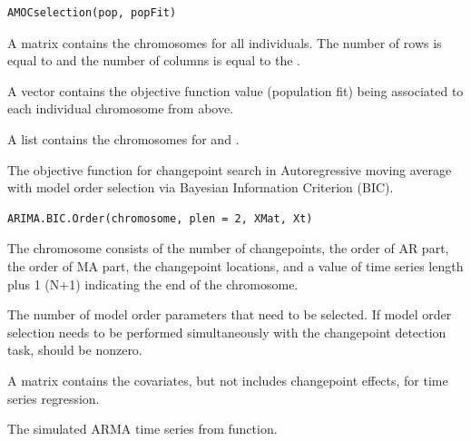 \documentclass[a4paper]{book}
\begin{document}
%
\begin{Usage}
\begin{verbatim}
AMOCselection(pop, popFit)
\end{verbatim}
\end{Usage}
%
\begin{Arguments}
\begin{ldescription}
\item[\code{pop}] A matrix contains the chromosomes for all individuals. The number of
rows is equal to  and the number of columns is equal to the
.

\item[\code{popFit}] A vector contains the objective function value (population fit)
being associated to each individual chromosome from above.
\end{ldescription}
\end{Arguments}
%
\begin{Value}
A list contains the chromosomes for  and .
\end{Value}
%
\begin{Description}
The objective function for changepoint search in Autoregressive
moving average with model order selection via Bayesian Information Criterion
(BIC).
\end{Description}
%
\begin{Usage}
\begin{verbatim}
ARIMA.BIC.Order(chromosome, plen = 2, XMat, Xt)
\end{verbatim}
\end{Usage}
%
\begin{Arguments}
\begin{ldescription}
\item[\code{chromosome}] The chromosome consists of the number of changepoints, the
order of AR part, the order of MA part, the changepoint locations, and a
value of time series length plus 1 (N+1) indicating the end of the chromosome.

\item[\code{plen}] The number of model order parameters that need to be selected.
If model order selection needs to be performed simultaneously with the
changepoint detection task,  should be nonzero.

\item[\code{XMat}] A matrix contains the covariates, but not includes changepoint
effects, for time series regression.

\item[\code{Xt}] The simulated ARMA time series from  function.
\end{ldescription}
\end{Arguments}
\end{document}
